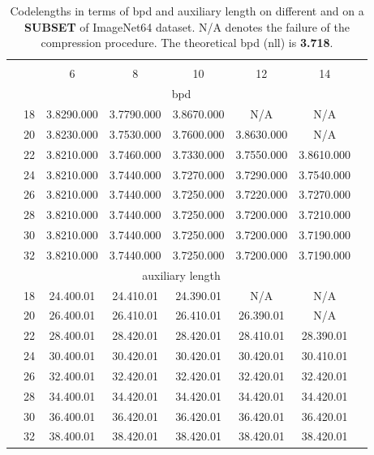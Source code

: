 \documentclass{article}
\newcommand{\ebar}[1]{{\tiny #1}}
\begin{document}
\begin{table}[ht]
\centering
\caption{Codelengths in terms of bpd and auxiliary length on different  and  on a \textbf{SUBSET} of ImageNet64 dataset. N/A denotes the failure of the compression procedure. The theoretical bpd (nll) is \textbf{3.718}.}
\small
\label{tab:hparam_img64}
\begin{tabular}{cccccccc}
\toprule
    & & \multicolumn{5}{c}{} \\
     &  & 6 & 8 & 10 & 12 & 14 \\
    \midrule
    \multicolumn{7}{c}{bpd} \\
    \midrule
    \multirow{8}{*}{} & 18 & 3.829\ebar{0.000} & 3.779\ebar{0.000} & 3.867\ebar{0.000} & N/A & N/A \\
        & 20 & 3.823\ebar{0.000} & 3.753\ebar{0.000} & 3.760\ebar{0.000} & 3.863\ebar{0.000} & N/A \\
        & 22 & 3.821\ebar{0.000} & 3.746\ebar{0.000} & 3.733\ebar{0.000} & 3.755\ebar{0.000} & 3.861\ebar{0.000} \\
        & 24 & 3.821\ebar{0.000} & 3.744\ebar{0.000} & 3.727\ebar{0.000} & 3.729\ebar{0.000} & 3.754\ebar{0.000} \\
        & 26 & 3.821\ebar{0.000} & 3.744\ebar{0.000} & 3.725\ebar{0.000} & 3.722\ebar{0.000} & 3.727\ebar{0.000} \\
        & 28 & 3.821\ebar{0.000} & 3.744\ebar{0.000} & 3.725\ebar{0.000} & 3.720\ebar{0.000} & 3.721\ebar{0.000} \\
        & 30 & 3.821\ebar{0.000} & 3.744\ebar{0.000} & 3.725\ebar{0.000} & 3.720\ebar{0.000} & 3.719\ebar{0.000} \\
        & 32 & 3.821\ebar{0.000} & 3.744\ebar{0.000} & 3.725\ebar{0.000} & 3.720\ebar{0.000} & 3.719\ebar{0.000} \\
    \midrule
    \multicolumn{7}{c}{auxiliary length} \\
    \midrule
    \multirow{8}{*}{} & 18 & 24.40\ebar{0.01} & 24.41\ebar{0.01} & 24.39\ebar{0.01} & N/A & N/A \\
        & 20 & 26.40\ebar{0.01} & 26.41\ebar{0.01} & 26.41\ebar{0.01} & 26.39\ebar{0.01} & N/A \\
        & 22 & 28.40\ebar{0.01} & 28.42\ebar{0.01} & 28.42\ebar{0.01} & 28.41\ebar{0.01} & 28.39\ebar{0.01} \\
        & 24 & 30.40\ebar{0.01} & 30.42\ebar{0.01} & 30.42\ebar{0.01} & 30.42\ebar{0.01} & 30.41\ebar{0.01} \\
        & 26 & 32.40\ebar{0.01} & 32.42\ebar{0.01} & 32.42\ebar{0.01} & 32.42\ebar{0.01} & 32.42\ebar{0.01} \\
        & 28 & 34.40\ebar{0.01} & 34.42\ebar{0.01} & 34.42\ebar{0.01} & 34.42\ebar{0.01} & 34.42\ebar{0.01} \\
        & 30 & 36.40\ebar{0.01} & 36.42\ebar{0.01} & 36.42\ebar{0.01} & 36.42\ebar{0.01} & 36.42\ebar{0.01} \\
        & 32 & 38.40\ebar{0.01} & 38.42\ebar{0.01} & 38.42\ebar{0.01} & 38.42\ebar{0.01} & 38.42\ebar{0.01} \\
\bottomrule
\end{tabular}
\end{table}
\end{document}
